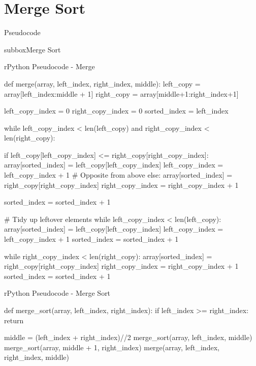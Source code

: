 \documentclass[10pt,a4paper]{article}
\begin{document}
\section*{Merge Sort}
\begin{textbox}{Pseudocode}
\begin{subbox}{subbox}{Merge Sort}
\begin{codebox}{r}{Python Pseudocode - Merge }


def merge(array, left_index, right_index, middle):
    left_copy = array[left_index:middle + 1]
    right_copy = array[middle+1:right_index+1]

    left_copy_index = 0
    right_copy_index = 0
    sorted_index = left_index

    while left_copy_index < len(left_copy) and right_copy_index < len(right_copy):

        if left_copy[left_copy_index] <= right_copy[right_copy_index]:
            array[sorted_index] = left_copy[left_copy_index]
            left_copy_index = left_copy_index + 1
        # Opposite from above
        else:
            array[sorted_index] = right_copy[right_copy_index]
            right_copy_index = right_copy_index + 1

       sorted_index = sorted_index + 1

    # Tidy up leftover elements
    while left_copy_index < len(left_copy):
        array[sorted_index] = left_copy[left_copy_index]
        left_copy_index = left_copy_index + 1
        sorted_index = sorted_index + 1

    while right_copy_index < len(right_copy):
        array[sorted_index] = right_copy[right_copy_index]
        right_copy_index = right_copy_index + 1
        sorted_index = sorted_index + 1
        
\end{codebox}
\begin{codebox}{r}{Python Pseudocode - Merge Sort}

def merge_sort(array, left_index, right_index):
    if left_index >= right_index:
        return

    middle = (left_index + right_index)//2
    merge_sort(array, left_index, middle)
    merge_sort(array, middle + 1, right_index)
    merge(array, left_index, right_index, middle)
    
\end{codebox}
\end{subbox}
\end{textbox}
\end{document}
